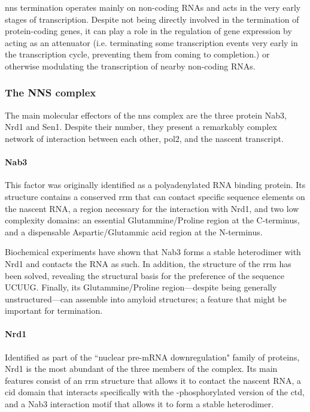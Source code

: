 \gls{nns} termination operates mainly on non-coding RNAs and acts in the very early stages of transcription.
Despite not being directly involved in the termination of protein-coding genes, it can play a role in the regulation of gene expression by acting as an attenuator (i.e. terminating some transcription events very early in the transcription cycle, preventing them from coming to completion.) or otherwise modulating the transcription of nearby non-coding RNAs.


\subsubsection{The NNS complex}

The main molecular effectors of the \gls{nns} complex are the three protein Nab3, Nrd1 and Sen1.
Despite their number, they present a remarkably complex network of interaction between each other, \gls{pol2}, and the nascent transcript.

\paragraph{Nab3}

This factor was originally identified as a polyadenylated RNA binding protein.
Its structure contains a conserved \gls{rrm} that can contact specific sequence elements on the nascent RNA, a region necessary for the interaction with Nrd1, and two low complexity domains: an essential Glutammine/Proline region at the C-terminus, and a dispensable Aspartic/Glutammic acid region at the N-terminus. 

Biochemical experiments have shown that Nab3 forms a stable heterodimer with Nrd1 and contacts the RNA as such. 
In addition, the structure of the \gls{rrm} has been solved, revealing the structural basis for the preference of the sequence UCUUG.
Finally, its Glutammine/Proline region---despite being generally unstructured---can assemble into amyloid structures; a feature that might be important for termination.


\paragraph{Nrd1}

Identified as part of the ``nuclear pre-mRNA downregulation" family of proteins, Nrd1 is the most abundant of the three members of the complex.
Its main features consist of an \gls{rrm} structure that allows it to contact the nascent RNA, a \gls{cid} domain that interacts specifically with the \serf{}-phosphorylated version of the \gls{ctd}, and a Nab3 interaction motif that allows it to form a stable heterodimer.

